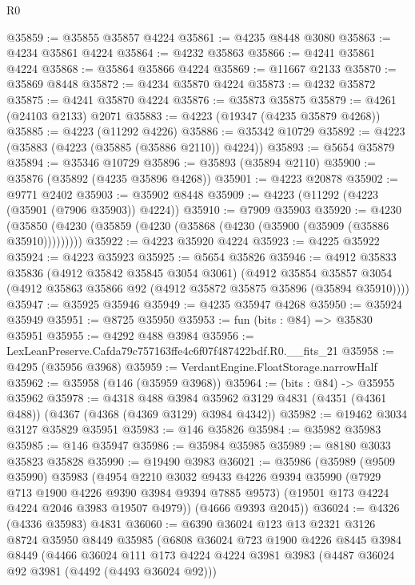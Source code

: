 \begin{lexlean}{R0}
\begin{coremodule}
@35859 := @35855 @35857 @4224
@35861 := @4235 @8448 @3080
@35863 := @4234 @35861 @4224
@35864 := @4232 @35863
@35866 := @4241 @35861 @4224
@35868 := @35864 @35866 @4224
@35869 := @11667 @2133
@35870 := @35869 @8448
@35872 := @4234 @35870 @4224
@35873 := @4232 @35872
@35875 := @4241 @35870 @4224
@35876 := @35873 @35875
@35879 := @4261 (@24103 @2133) @2071
@35883 := @4223 (@19347 (@4235 @35879 @4268))
@35885 := @4223 (@11292 @4226)
@35886 := @35342 @10729
@35892 := @4223 (@35883 (@4223 (@35885 (@35886 @2110)) @4224))
@35893 := @5654 @35879
@35894 := @35346 @10729
@35896 := @35893 (@35894 @2110)
@35900 := @35876 (@35892 (@4235 @35896 @4268))
@35901 := @4223 @20878
@35902 := @9771 @2402
@35903 := @35902 @8448
@35909 := @4223 (@11292 (@4223 (@35901 (@7906 @35903)) @4224))
@35910 := @7909 @35903
@35920 := @4230 (@35850 (@4230 (@35859 (@4230 (@35868 (@4230 (@35900 (@35909 (@35886 @35910)))))))))
@35922 := @4223 @35920 @4224
@35923 := @4225 @35922
@35924 := @4223 @35923
@35925 := @5654 @35826
@35946 := @4912
    @35833
    @35836
    (@4912 @35842 @35845 @3054 @3061)
    (@4912
      @35854
      @35857
      @3054
      (@4912 @35863 @35866 @92 (@4912 @35872 @35875 @35896 (@35894 @35910))))
@35947 := @35925 @35946
@35949 := @4235 @35947 @4268
@35950 := @35924 @35949
@35951 := @8725 @35950
@35953 := fun (bits : @84) => @35830 @35951
@35955 := @4292 @488 @3984
@35956 := LexLeanPreserve.Cafda79c757163ffe4c6f07f487422bdf.R0.__fits_21
@35958 := @4295 (@35956 @3968)
@35959 := VerdantEngine.FloatStorage.narrowHalf
@35962 := @35958 (@146 (@35959 @3968))
@35964 := (bits : @84) -> @35955 @35962
@35978 := @4318
    @488
    @3984
    @35962
    @3129
    @4831
    (@4351 (@4361 @488))
    (@4367 (@4368 (@4369 @3129) @3984 @4342))
@35982 := @19462 @3034 @3127 @35829 @35951
@35983 := @146 @35826
@35984 := @35982 @35983
@35985 := @146 @35947
@35986 := @35984 @35985
@35989 := @8180 @3033 @35823 @35828
@35990 := @19490 @3983
@36021 := @35986
    (@35989
      (@9509 @35990)
      @35983
      (@4954
        @2210
        @3032
        @9433
        @4226
        @9394
        @35990
        (@7929 @713 @1900 @4226 @9390 @3984 @9394 @7885 @9573)
        (@19501 @173 @4224 @4224 @2046 @3983 @19507 @4979))
      (@4666 @9393 @2045))
@36024 := @4326 (@4336 @35983) @4831
@36060 := @6390
    @36024
    @123
    @13
    @2321
    @3126
    @8724
    @35950
    @8449
    @35985
    (@6808
      @36024
      @723
      @1900
      @4226
      @8445
      @3984
      @8449
      (@4466
        @36024
        @111
        @173
        @4224
        @4224
        @3981
        @3983
        (@4487 @36024 @92 @3981 (@4492 (@4493 @36024 @92)))

\end{coremodule}
\end{lexlean}
